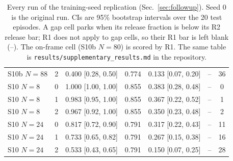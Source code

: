 \documentclass[11pt]{article}
\begin{document}
\begin{table}[h]
\begin{tabular}{llccccc}
S10b $N{=}88$ & 2 & 0.400 [0.28, 0.50] & 0.774 & 0.133 [0.07, 0.20] & -- & 36 \\
S10 $N{=}8$ & 0 & 1.000 [1.00, 1.00] & 0.855 & 0.383 [0.28, 0.48] & -- & 0 \\
S10 $N{=}8$ & 1 & 0.983 [0.95, 1.00] & 0.855 & 0.367 [0.22, 0.52] & -- & 1 \\
S10 $N{=}8$ & 2 & 0.967 [0.92, 1.00] & 0.855 & 0.350 [0.23, 0.48] & -- & 2 \\
S10 $N{=}24$ & 0 & 0.817 [0.72, 0.90] & 0.791 & 0.317 [0.22, 0.43] & -- & 11 \\
S10 $N{=}24$ & 1 & 0.733 [0.65, 0.82] & 0.791 & 0.267 [0.15, 0.38] & -- & 16 \\
S10 $N{=}24$ & 2 & 0.533 [0.43, 0.65] & 0.791 & 0.150 [0.07, 0.25] & -- & 28 \\
\bottomrule
\end{tabular}
\caption{Every run of the training-seed replication (Sec.~\ref{sec:followup}). Seed 0 is the original run. CIs are
95\% bootstrap intervals over the 20 test episodes. A gap cell parks when its release fraction is below its R2 release
bar; R1 does not apply to gap cells, so their R1 bar is left blank (--). The on-frame cell (S10b $N{=}80$) is scored
by R1. The same table is \texttt{results/supplementary\_results.md} in the
repository.}
\end{table}



\end{document}

